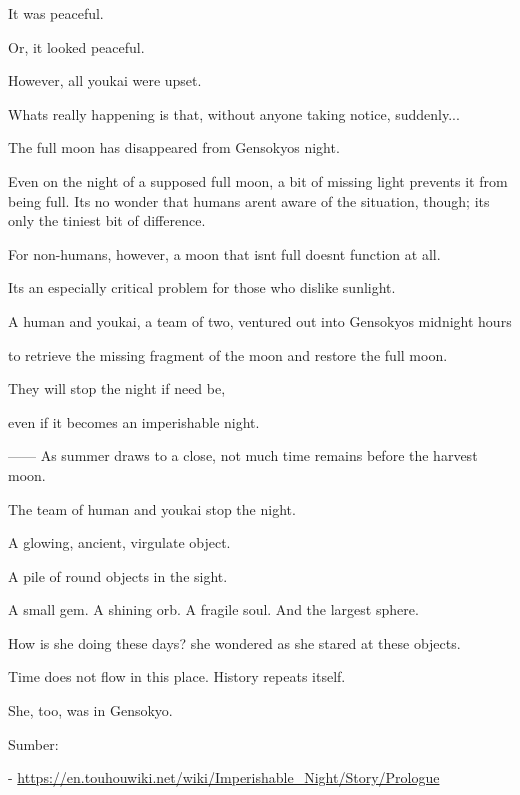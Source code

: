 \begin{tcolorbox}[breakable, colback=white, colframe=black!80,
  boxrule=0.6pt, arc=0mm, left=3mm, right=3mm, top=2mm, bottom=2mm]
\medskip
\medskip
It was peaceful.\par
Or, it looked peaceful.\par
However, all youkai were upset.\par
What\textquotesingle{}s really happening is that, without anyone taking notice, suddenly...\par
The full moon has disappeared from Gensokyo\textquotesingle{}s night.\par
Even on the night of a supposed full moon, a bit of missing light prevents it from being full. It\textquotesingle{}s no wonder that humans aren\textquotesingle{}t aware of the situation, though; it\textquotesingle{}s only the tiniest bit of difference.\par
For non-{}humans, however, a moon that isn\textquotesingle{}t full doesn\textquotesingle{}t function at all.\par
It\textquotesingle{}s an especially critical problem for those who dislike sunlight.\par
A human and youkai, a team of two, ventured out into Gensokyo\textquotesingle{}s midnight hours\par
to retrieve the missing fragment of the moon and restore the full moon.\par
They will stop the night if need be,\par
even if it becomes an imperishable night.\par
------ As summer draws to a close, not much time remains before the harvest moon.\par
The team of human and youkai stop the night.\par
\medskip
\medskip
A glowing, ancient, virgulate object.\par
A pile of round objects in the sight.\par
A small gem. A shining orb. A fragile soul. And the largest sphere.\par
\textquotedbl{}How is she doing these days?\textquotedbl{} she wondered as she stared at these objects.\par
Time does not flow in this place. History repeats itself.\par
She, too, was in Gensokyo.\par
\bigskip
Sumber:\par
\hspace*{1.5em}- \url{https://en.touhouwiki.net/wiki/Imperishable_Night/Story/Prologue}
\end{tcolorbox}
